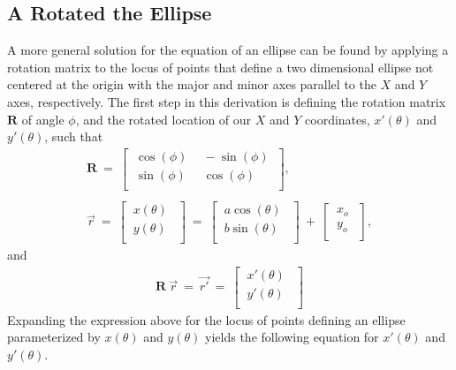 \documentclass[12pt,runningheads]{article}
\begin{document}
\subsection*{A Rotated the Ellipse}
A more general solution for the equation of an ellipse can be found by applying a rotation matrix to the locus of points that define a two dimensional ellipse not centered at the origin with the major and minor axes parallel to the $X$ and $Y$ axes, respectively. The first step in this derivation is defining the rotation matrix $\textbf{R}$ of angle $\phi$, and the rotated location of our $X$ and $Y$ coordinates, $x'(\theta)$ and $y'(\theta)$, such that
\begin{align*}
\textbf{R}\ =\
\begin{bmatrix}
\ \cos(\phi)\ &\ -\sin(\phi)\ \\ 
\ \sin(\phi)\ &\ \cos(\phi)\ \\ 
\end{bmatrix},\\ \\
\vec{r}\ =\ 
\begin{bmatrix}
\ x(\theta)\ \ \\
\ y(\theta)\ \ \\
\end{bmatrix}\ =\ 
\begin{bmatrix}
\ a\cos(\theta)\ \ \\
\ b\sin(\theta)\ \ \\
\end{bmatrix}\ +\ 
\begin{bmatrix}
\ x_{o}\ \ \\
\ y_{o}\ \ \\
\end{bmatrix},
\end{align*}
and
\begin{align*}
\textbf{R}\ \vec{r}\  =\ \vec{r'}\ =\  
\begin{bmatrix}
\ x'(\theta)\ \ \\
\ y'(\theta)\ \ \\
\end{bmatrix}
\end{align*}
Expanding the expression above for the locus of points defining an ellipse parameterized by $x(\theta)$ and $y(\theta)$ yields the following equation for $x'(\theta)$ and $y'(\theta)$.
\end{document}
